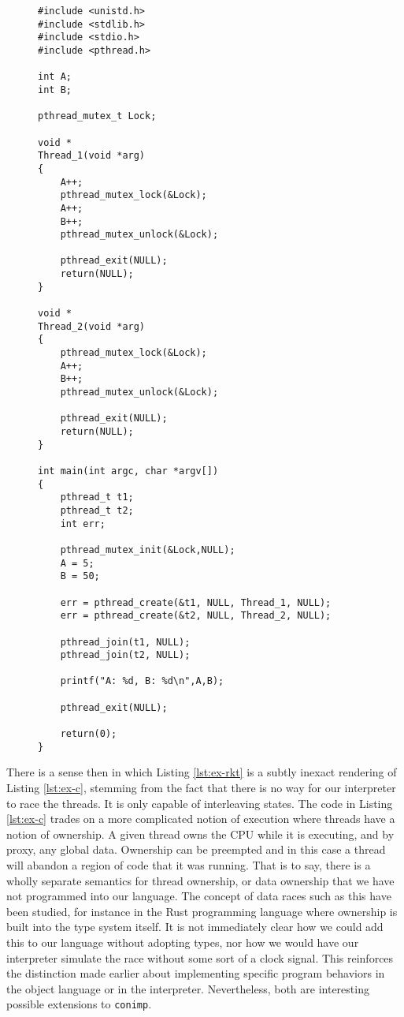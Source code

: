 \begin{figure}
\begin{lstlisting}[label={lst:ex-c},caption={Two threads concurrently updating a global store (C).},captionpos=b,frame=single,xrightmargin=1em]
#include <unistd.h>
#include <stdlib.h>
#include <stdio.h>
#include <pthread.h>

int A;
int B;

pthread_mutex_t Lock;

void *
Thread_1(void *arg)
{
	A++;
	pthread_mutex_lock(&Lock);
	A++;
	B++;
	pthread_mutex_unlock(&Lock);

	pthread_exit(NULL);
	return(NULL);
}

void *
Thread_2(void *arg)
{
	pthread_mutex_lock(&Lock);
	A++;
	B++;
	pthread_mutex_unlock(&Lock);

	pthread_exit(NULL);
	return(NULL);
}

int main(int argc, char *argv[])
{
	pthread_t t1;
	pthread_t t2;
	int err;

	pthread_mutex_init(&Lock,NULL);
	A = 5;
	B = 50;

	err = pthread_create(&t1, NULL, Thread_1, NULL);
	err = pthread_create(&t2, NULL, Thread_2, NULL);

	pthread_join(t1, NULL);
	pthread_join(t2, NULL);

	printf("A: %d, B: %d\n",A,B);

	pthread_exit(NULL);

	return(0);
}
\end{lstlisting}
\end{figure}

There is a sense then in which Listing \ref{lst:ex-rkt} is a subtly inexact rendering of Listing \ref{lst:ex-c}, stemming from the fact that there is no way for our interpreter to race the threads.  It is only capable of interleaving states.  The code in Listing \ref{lst:ex-c} trades on a more complicated notion of execution where threads have a notion of ownership.  A given thread owns the CPU while it is executing, and by proxy, any global data.  Ownership can be preempted and in this case a thread will abandon a region of code that it was running.  That is to say, there is a wholly separate semantics for thread ownership, or data ownership that we have not programmed into our language.  The concept of data races such as this have been studied, for instance in the Rust programming language \citep{rust2018} where ownership is built into the type system itself.  It is not immediately clear how we could add this to our language without adopting types, nor how we would have our interpreter simulate the race without some sort of a clock signal.  This reinforces the distinction made earlier about implementing specific program behaviors in the object language or in the interpreter.  Nevertheless, both are interesting possible extensions to \texttt{conimp}.  

